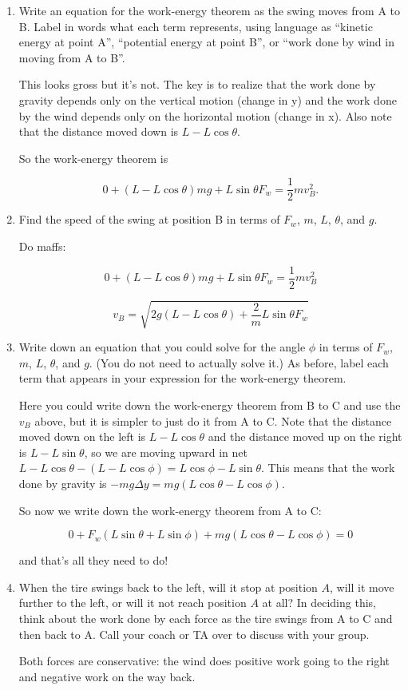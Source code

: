 \documentclass[12pt]{article}
\begin{document}
 
   \begin{enumerate}
 	\item Write an equation for the work-energy theorem as the swing moves from A to B. Label in words what each term represents, using language as ``kinetic energy at point A'', ``potential energy at point B'', or ``work done by wind in moving from A to B''.
 	
{\color{Red} This looks gross but it's not. The key is to realize that the work done by gravity depends only on the vertical motion (change in y) and the work done by the wind depends only on the horizontal motion (change in x).
	Also note that the distance moved down is $L - L \cos \theta$.

So the work-energy theorem is

$$0 + (L - L \cos \theta) mg + L \sin \theta F_w = \frac{1}{2}mv_B^2.$$

}
 	\item Find the speed of the swing at position B in terms of $F_w$, $m$, $L$, $\theta$, and $g$.
 	
 	{\color{Red} Do maffs:
 		
 		$$0 + (L - L \cos \theta) mg + L \sin \theta F_w = \frac{1}{2}mv_B^2$$
 		
 		$$v_B = \sqrt {2g(L - L \cos \theta) + \frac{2}{m} L \sin \theta F_w}$$
 		
 	}
 	
 	
 	\item Write down an equation that you could solve for the angle $\phi$ in terms of $F_w$, $m$, $L$, $\theta$, and $g$. (You do not need to actually solve it.) As before, label each term that appears in your expression for the work-energy theorem.
 	
 	{\color{Red} Here you could write down the work-energy theorem from B to C and use the $v_B$ above, but it is simpler to just do it from A to C. Note that the distance moved down on the left is $L - L \cos \theta$ and the distance moved up on the right is $L - L \sin \theta$, so we are moving upward in net $L - L \cos \theta - (L - L \cos \phi) = L \cos \phi - L \sin \theta$. This means that the work done by gravity is $-mg \Delta y = mg(L \cos \theta - L \cos \phi)$.
 		
 		So now we write down the work-energy theorem from A to C:
 		
 		$$
 		0 + F_w(L \sin \theta + L \sin \phi) + mg(L \cos \theta - L \cos \phi) = 0
 		$$
 		
 		and that's all they need to do!
 	}
 		
 	
 	
 	\item When the tire swings back to the left, will it stop at position $A$, will it move further to the left, or will it not reach position $A$ at all? In deciding this, think about the work done by each force as the tire swings from A to C and then back to A. Call your coach or TA over to discuss with your group.
 	
 	
 	{\color{Red} Both forces are conservative: the wind does positive work going to the right and negative work on the way back.}
 	
 \end{enumerate}
 


 
\end{document}

